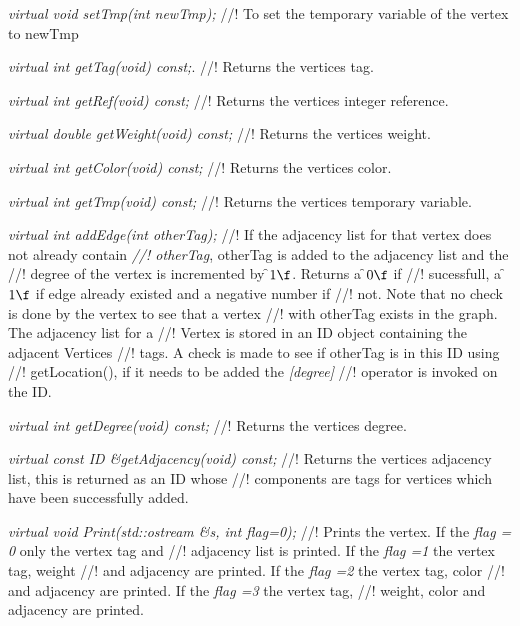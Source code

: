 {\em virtual void setTmp(int newTmp);}
//! To set the temporary variable of the vertex to \p newTmp    

{\em virtual int getTag(void) const;}.
//! Returns the vertices tag.

{\em virtual int getRef(void) const; }
//! Returns the vertices integer reference.

{\em virtual double getWeight(void) const;}
//! Returns the vertices weight.

{\em virtual int getColor(void) const; }
//! Returns the vertices color.

{\em virtual int getTmp(void) const; }
//! Returns the vertices temporary variable.

{\em virtual int addEdge(int otherTag); }
//! If the adjacency list for that vertex does not already contain {\em
//! otherTag}, \p otherTag is added to the adjacency list and the
//! degree of the vertex is incremented by \f$1\f$. Returns a \f$0\f$ if
//! sucessfull, a \f$1\f$ if edge already existed and a negative number if
//! not. Note that no check is done by the vertex to see that a vertex
//! with \p otherTag exists in the graph. The adjacency list for a
//! Vertex is stored in an ID object containing the adjacent Vertices
//! tags. A check is made to see if \p otherTag is in this ID using
//! getLocation(), if it needs to be added the {\em [degree]}
//! operator is invoked on the ID. 

{\em virtual int getDegree(void) const;}
//! Returns the vertices degree.

{\em virtual const ID \&getAdjacency(void) const;}
//! Returns the vertices adjacency list, this is returned as an ID whose
//! components are tags for vertices which have been successfully added.
    
{\em virtual void Print(std::ostream \&s, int flag=0);}
//! Prints the vertex. If the {\em flag = 0} only the vertex tag and
//! adjacency list is printed. If the {\em flag =1} the vertex tag, weight
//! and adjacency are printed. If the {\em flag =2} the vertex tag, color
//! and adjacency are printed. If the {\em flag =3} the vertex tag,
//! weight, color and adjacency are printed.  






